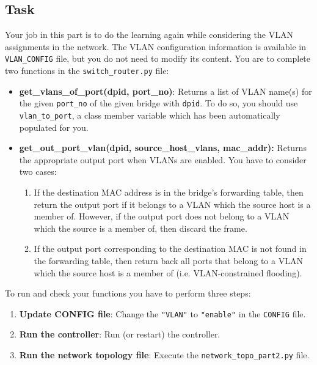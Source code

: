 \documentclass[11pt]{article}
\begin{document}
\subsection{Task}
\label{subsec:logiclearning-vlan}
Your job in this part is to do the learning again while considering the VLAN assignments in the network.
The VLAN configuration information is available in \texttt{VLAN\_CONFIG} file, but you do not need to modify its content.
You are to complete two functions in the \texttt{switch\_router.py} file:


\begin{itemize}
    \item \textbf{get\_vlans\_of\_port(dpid, port\_no)}: Returns a list of VLAN name(s) for the given \texttt{port\_no} of the given bridge with \texttt{dpid}. To do so, you should use \texttt{vlan\_to\_port}, a class member variable which has been automatically populated for you.

    \item \textbf{get\_out\_port\_vlan(dpid, source\_host\_vlans, mac\_addr):} Returns the appropriate output port when VLANs are enabled. You have to consider two cases:\\
    \begin{enumerate}
        \item If the destination MAC address is in the bridge's forwarding table, then return the output port if it belongs to a VLAN which the source host is a member of. However, if the output port does not belong to a VLAN which the source is a member of, then discard the frame.
        \item If the output port corresponding to the destination MAC is not found in the forwarding table, then return back all ports that belong to a VLAN which the source host is a member of (i.e. VLAN-constrained flooding).
    \end{enumerate}

\end{itemize}

To run and check your functions you have to perform three steps:
\begin{enumerate}
    \item \textbf{Update CONFIG file}: Change the \texttt{"VLAN"} to \texttt{"enable"} in the \texttt{CONFIG} file.
    \item \textbf{Run the controller}: Run (or restart) the controller.
    \item \textbf{Run the network topology file}: Execute the \texttt{network\_topo\_part2.py} file.
\end{enumerate}
\end{document}

